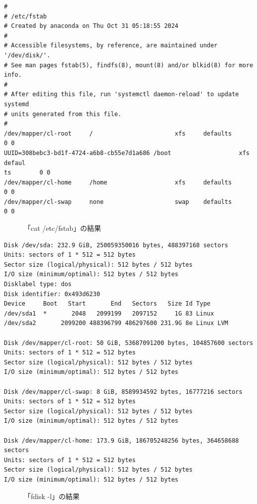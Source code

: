\documentclass{ltjsarticle} %
\begin{document}
\begin{mdframed}
  \begin{verbatim}
#
# /etc/fstab
# Created by anaconda on Thu Oct 31 05:18:55 2024
#
# Accessible filesystems, by reference, are maintained under '/dev/disk/'.
# See man pages fstab(5), findfs(8), mount(8) and/or blkid(8) for more info.
#
# After editing this file, run 'systemctl daemon-reload' to update systemd
# units generated from this file.
#
/dev/mapper/cl-root     /                       xfs     defaults        0 0
UUID=308bebc3-bd1f-4724-a6b8-cb55e7d1a686 /boot                   xfs     defaul                                                                             ts        0 0
/dev/mapper/cl-home     /home                   xfs     defaults        0 0
/dev/mapper/cl-swap     none                    swap    defaults        0 0
  \end{verbatim}
  \end{mdframed}
  \begin{figure}[H]
  \caption{「cat /etc/fstab」の結果}
  \label{fig:fstab}
\end{figure}

\begin{mdframed}
  \begin{verbatim}
Disk /dev/sda: 232.9 GiB, 250059350016 bytes, 488397168 sectors
Units: sectors of 1 * 512 = 512 bytes  
Sector size (logical/physical): 512 bytes / 512 bytes  
I/O size (minimum/optimal): 512 bytes / 512 bytes  
Disklabel type: dos  
Disk identifier: 0x493d6230
Device     Boot   Start       End   Sectors   Size Id Type
/dev/sda1  *       2048   2099199   2097152     1G 83 Linux
/dev/sda2       2099200 488396799 486297600 231.9G 8e Linux LVM

Disk /dev/mapper/cl-root: 50 GiB, 53687091200 bytes, 104857600 sectors
Units: sectors of 1 * 512 = 512 bytes
Sector size (logical/physical): 512 bytes / 512 bytes
I/O size (minimum/optimal): 512 bytes / 512 bytes

Disk /dev/mapper/cl-swap: 8 GiB, 8589934592 bytes, 16777216 sectors
Units: sectors of 1 * 512 = 512 bytes
Sector size (logical/physical): 512 bytes / 512 bytes
I/O size (minimum/optimal): 512 bytes / 512 bytes

Disk /dev/mapper/cl-home: 173.9 GiB, 186705248256 bytes, 364658688 sectors
Units: sectors of 1 * 512 = 512 bytes
Sector size (logical/physical): 512 bytes / 512 bytes
I/O size (minimum/optimal): 512 bytes / 512 bytes
  \end{verbatim}
  \end{mdframed}
  \begin{figure}[H]
  \caption{「fdisk -l」の結果}
  \label{fig:fdisk}
\end{figure}
\end{document}
